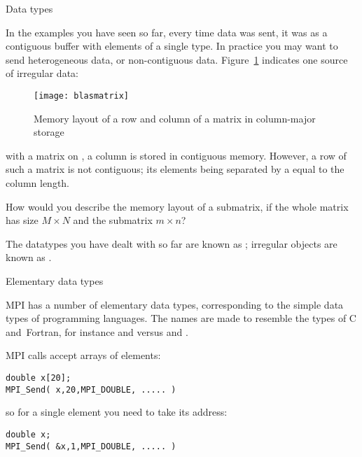 
% 
 {Data types}

In the examples you have seen so far, every time data was sent,
it was as a contiguous buffer with elements of a single type.
In practice you may want to send heterogeneous data, or
non-contiguous data.
Figure~\ref{fig:blasmatrix} indicates one source of irregular
data:
%
\begin{figure}[ht]
  \texttt{[image: blasmatrix]}
  \caption{Memory layout of a row and column of a matrix in column-major storage}
  \label{fig:blasmatrix}
\end{figure}
%
with a matrix on , a column is
stored in contiguous memory. However, a row of such a matrix
is not contiguous; its elements being separated by a 
equal to the column length.

\begin{exercise}
  \label{ex:submatrix}
  How would you describe the memory layout of a submatrix,
  if the whole matrix has size $M\times N$ and the submatrix $m\times n$?
\end{exercise}

The datatypes you have dealt with so far are known as
; irregular objects
are known as .

 {Elementary data types}

MPI has a number of elementary data types, corresponding to the 
simple data types of programming languages.
The names are made to resemble the types of C and~Fortran, 
for instance  and  versus
 and .

MPI calls accept arrays of elements:
\begin{verbatim}
double x[20];
MPI_Send( x,20,MPI_DOUBLE, ..... )
\end{verbatim}
so for a single element you need to take its address:
\begin{verbatim}
double x;
MPI_Send( &x,1,MPI_DOUBLE, ..... )
\end{verbatim}

